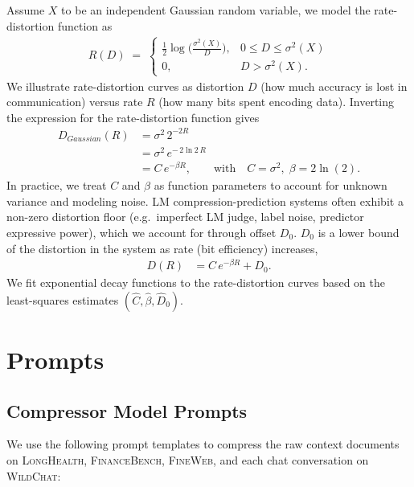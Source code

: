 \documentclass{article} %
\begin{document}
Assume $X$ to be an independent Gaussian random variable, we model the rate-distortion function as 
\begin{align*}
    R(D) \;=\; \begin{cases}
\displaystyle \tfrac{1}{2}\log\bigl( \tfrac{\sigma^{2}(X)}{D} \bigr), & 0 \le D \le \sigma^{2}(X)\\[6pt]
0, & D > \sigma^{2}(X).
\end{cases}
\end{align*}
We illustrate rate-distortion curves as distortion \(D\) (how much accuracy is lost in communication) versus rate \(R\) (how many bits spent encoding data). Inverting the expression for the rate-distortion function gives \citep{wiley2005ratedistortion}
\begin{align*}
    D_{Gaussian}(R) &= \sigma^{2}\,2^{-2R} \\
         &= \sigma^{2}\,e^{-\,2\ln 2\,R} \\
         &= C\,e^{-\beta R}, \qquad\text{with}\quad
C=\sigma^{2},\; \beta=2\ln(2).
\end{align*}
In practice, we treat \(C\) and \(\beta\) as function parameters to account for unknown variance and modeling noise. LM compression-prediction systems often exhibit a non-zero distortion floor (e.g.\ imperfect LM judge, label noise, predictor expressive power), which we account for through offset \(D_{0}\). \(D_{0}\) is a lower bound of the distortion in the system as rate (bit efficiency) increases,
\begin{align*}
    D(R) &= C\,e^{-\beta R} + D_0.
\end{align*}
We fit exponential decay functions to the rate-distortion curves based on the least-squares estimates \((\hat C,\hat\beta,\hat D_{0})\).


\section{Prompts}
\label{sec:appendix-prompts}

\subsection{Compressor Model Prompts}
\label{sec:appendix-prompts-compression}
We use the following prompt templates to compress the raw context documents on \textsc{LongHealth}, \textsc{FinanceBench}, \textsc{FineWeb}, and each chat conversation on \textsc{WildChat}:
\end{document}
